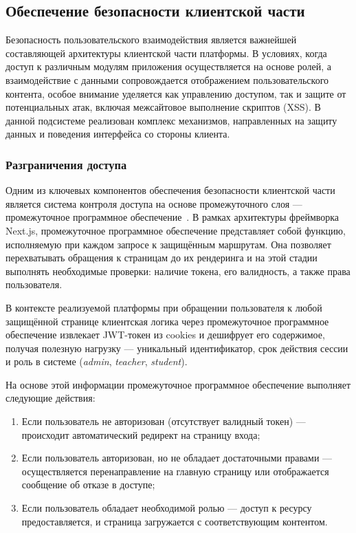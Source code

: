 \subsection{Обеспечение безопасности клиентской части}

Безопасность пользовательского взаимодействия является важнейшей составляющей архитектуры клиентской части платформы. В условиях, когда доступ к различным модулям приложения осуществляется на основе ролей, а взаимодействие с данными сопровождается отображением пользовательского контента, особое внимание уделяется как управлению доступом, так и защите от потенциальных атак, включая межсайтовое выполнение скриптов (XSS). В данной подсистеме реализован комплекс механизмов, направленных на защиту данных и поведения интерфейса со стороны клиента.

\subsubsection{Разграничения доступа}
Одним из ключевых компонентов обеспечения безопасности клиентской части является система контроля доступа на основе промежуточного слоя — промежуточное программное обеспечение~\cite{nextjs_middleware}. В рамках архитектуры фреймворка Next.js, промежуточное программное обеспечение представляет собой функцию, исполняемую при каждом запросе к защищённым маршрутам. Она позволяет перехватывать обращения к страницам до их рендеринга и на этой стадии выполнять необходимые проверки: наличие токена, его валидность, а также права пользователя.

В контексте реализуемой платформы при обращении пользователя к любой защищённой странице клиентская логика через промежуточное программное обеспечение извлекает JWT-токен из cookies и дешифрует его содержимое, получая полезную нагрузку — уникальный идентификатор, срок действия сессии и роль в системе (\textit{admin}, \textit{teacher}, \textit{student}).

На основе этой информации промежуточное программное обеспечение выполняет следующие действия:
\begin{enumerate}
  \item Если пользователь не авторизован (отсутствует валидный токен) — происходит автоматический редирект на страницу входа;
  \item Если пользователь авторизован, но не обладает достаточными правами — осуществляется перенаправление на главную страницу или отображается сообщение об отказе в доступе;
  \item Если пользователь обладает необходимой ролью — доступ к ресурсу предоставляется, и страница загружается с соответствующим контентом.
\end{enumerate}

